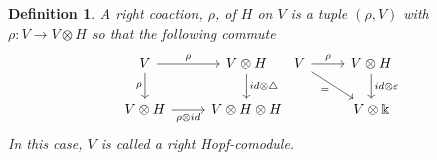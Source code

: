 \documentclass[12pt,a4paper]{article}
\newtheorem{definition}[theorem]{Definition}
\newcommand{\kk}{\Bbbk}
\newcommand\1{_{(1)}}
\newcommand\2{_{(2)}}
\begin{document}
\begin{definition}
A right coaction, $\rho$, of $H$ on $V$ is a tuple $(\rho,V)$ with $\rho:V\to V\otimes H$ so that the following commute\[
\begin{tikzcd}
V \arrow[r, "\rho"] \arrow[d, "\rho"']  & V\otimes H \arrow[d, "id\otimes \triangle"] \\
V\otimes H \arrow[r, "\rho\otimes id"'] & V\otimes H\otimes H                        
\end{tikzcd}
\begin{tikzcd}
V \arrow[r, "\rho"] \arrow[rd, "="'] & V\otimes H \arrow[d, "id\otimes\varepsilon"] \\
                                     & V\otimes\kk                                 
\end{tikzcd}
\]
In this case, $V$ is called a right Hopf-comodule.\\
\end{definition}
\end{document}
